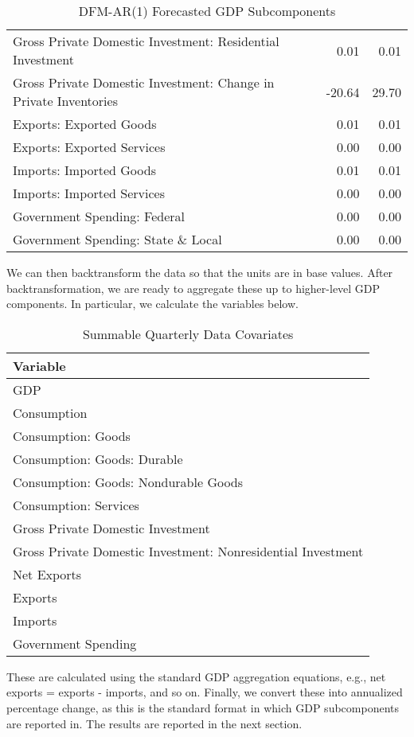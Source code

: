 \documentclass[11pt, letterpaper]{article}\usepackage[]{graphicx}\usepackage[]{color}
\begin{document}
\begin{table}[H]
\begin{tabular}{lrrr}
  Gross Private Domestic Investment: Residential Investment &  & 0.01 & 0.01 \\ 
  Gross Private Domestic Investment: Change in Private Inventories &  & -20.64 & 29.70 \\ 
  Exports: Exported Goods &  & 0.01 & 0.01 \\ 
  Exports: Exported Services &  & 0.00 & 0.00 \\ 
  Imports: Imported Goods &  & 0.01 & 0.01 \\ 
  Imports: Imported Services &  & 0.00 & 0.00 \\ 
  Government Spending: Federal &  & 0.00 & 0.00 \\ 
  Government Spending: State \& Local &  & 0.00 & 0.00 \\ 
   \hline
\end{tabular}
\endgroup
\caption{DFM-AR(1) Forecasted GDP Subcomponents} 
\end{table}


We can then backtransform the data so that the units are in base values. After backtransformation, we are ready to aggregate these up to higher-level GDP components. In particular, we calculate the variables below.
\begin{table}[H]
\centering
\begingroup\scriptsize
\begin{tabular}{l}
  \hline
Variable \\ 
  \hline
GDP \\ 
  Consumption \\ 
  Consumption: Goods \\ 
  Consumption: Goods: Durable \\ 
  Consumption: Goods: Nondurable Goods \\ 
  Consumption: Services \\ 
  Gross Private Domestic Investment \\ 
  Gross Private Domestic Investment: Nonresidential Investment \\ 
  Net Exports \\ 
  Exports \\ 
  Imports \\ 
  Government Spending \\ 
   \hline
\end{tabular}
\endgroup
\caption{Summable Quarterly Data Covariates} 
\end{table}

These are calculated using the standard GDP aggregation equations, e.g., net exports = exports - imports, and so on.
Finally, we convert these into annualized percentage change, as this is the standard format in which GDP subcomponents are reported in. The results are reported in the next section.
\end{document}
